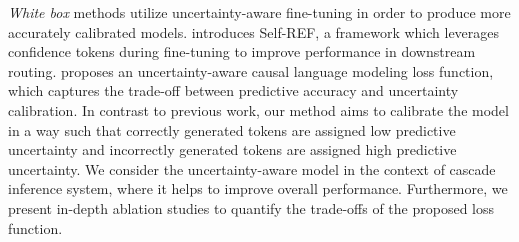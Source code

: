 \emph{White box} methods utilize uncertainty-aware fine-tuning in order to produce more accurately calibrated models. \citet{chuang2024learningrouteconfidencetokens} introduces Self-REF, a framework which leverages confidence tokens during fine-tuning to improve performance in downstream routing. \citet{krishnan2024enhancingtrustlargelanguage} proposes an uncertainty-aware causal language modeling loss function, which captures the trade-off between predictive accuracy and uncertainty calibration. In contrast to previous work, our method aims to calibrate the model in a way such that correctly generated tokens are assigned low predictive uncertainty and incorrectly generated tokens are assigned high predictive uncertainty. We consider the uncertainty-aware model in the context of cascade inference system, where it helps to improve overall performance. Furthermore, we present in-depth ablation studies to quantify the trade-offs of the proposed loss function.



